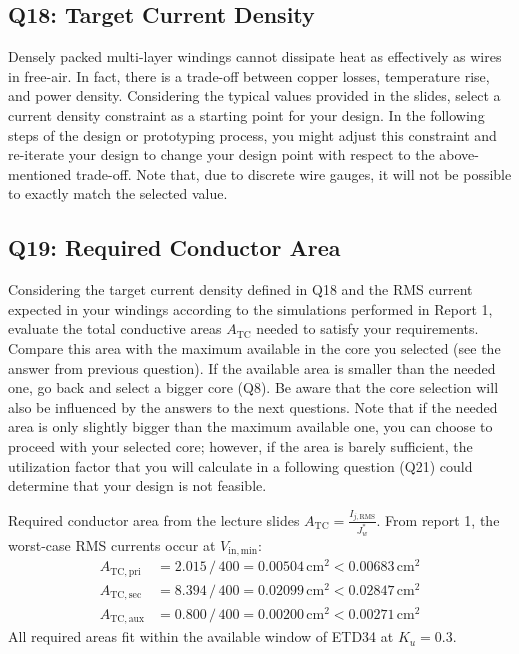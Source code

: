 \documentclass{PELsmallreport}
\begin{document}
\subsection{Q18: Target Current Density} 
Densely packed multi-layer windings cannot dissipate heat as effectively as wires in free-air. 
In fact, there is a trade-off between copper losses, temperature rise, and power density. 
Considering the typical values provided in the slides, select a current density constraint as a starting point for your design. 
In the following steps of the design or prototyping process, you might adjust this constraint and re-iterate your design to change your design point with respect to the above-mentioned trade-off. 
Note that, due to discrete wire gauges, it will not be possible to exactly match the selected value. \\

 \hfill{}




\subsection{Q19: Required Conductor Area} 
Considering the target current density defined in Q18 and the RMS current expected in your windings according to the simulations performed in Report 1, evaluate the total conductive areas $A_\mathrm{TC}$ needed to satisfy your requirements. 
Compare this area with the maximum available in the core you selected (see the answer from previous question). 
If the available area is smaller than the needed one, go back and select a bigger core (Q8). 
Be aware that the core selection will also be influenced by the answers to the next questions.  
Note that if the needed area is only slightly bigger than the maximum available one, you can choose to proceed with your selected core; however, if the area is barely sufficient, the utilization factor that you will calculate in a following question (Q21) could determine that your design is not feasible.  
\\

\begin{framed}
	\vspace{2em}
	Required conductor area from the lecture slides $A_\mathrm{TC} = \frac{I_{j,\mathrm{RMS}}}{J_w^*}$. From report 1, the worst-case RMS currents occur at $V_\mathrm{in,min}$:
\begin{align}
    A_\mathrm{TC,pri} &= 2.015\,/\,400 = 0.00504\,\mathrm{cm}^2 < 0.00683\,\mathrm{cm}^2 \\
    A_\mathrm{TC,sec} &= 8.394\,/\,400 = 0.02099\,\mathrm{cm}^2 < 0.02847\,\mathrm{cm}^2 \\
    A_\mathrm{TC,aux} &= 0.800\,/\,400 = 0.00200\,\mathrm{cm}^2 < 0.00271\,\mathrm{cm}^2
\end{align}
All required areas fit within the available window of ETD34 at $K_u=0.3$.
	\vspace{2em}
\end{framed}
\end{document}
